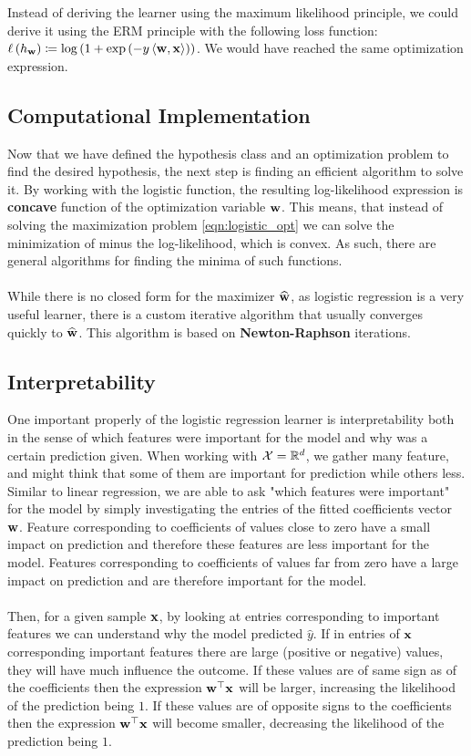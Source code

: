 \begin{remark}
	Instead of deriving the learner using the maximum likelihood principle, we could derive it using the ERM principle with the following loss function: $\ell\left(h_{\mathbf{w}}\right)\coloneqq \log\left(1+\exp\left(-y\left\langle \mathbf{w},\mathbf{x}\right\rangle\right)\right)$. We would have reached the same optimization expression.
\end{remark}

\subsection{Computational Implementation}
Now that we have defined the hypothesis class and an optimization problem to find the desired hypothesis, the next step is finding an efficient algorithm to solve it. By working with the logistic function, the resulting log-likelihood expression is \textbf{concave} function of the optimization variable $\mathbf{w}$. This means, that instead of solving the maximization problem \ref{eqn:logistic_opt} we can solve the minimization of minus the log-likelihood, which is convex. As such, there are general algorithms for finding the minima of such functions.
\\~\\
While there is no closed form for the maximizer $\widehat{\mathbf{w}}$, as logistic regression is a very useful learner, there is a custom iterative algorithm that usually converges quickly to $\widehat{\mathbf{w}}$. This algorithm is based on \textbf{Newton-Raphson} iterations.


\subsection{Interpretability}
One important properly of the logistic regression learner is interpretability both in the sense of which features were important for the model and why was a certain prediction given. When working with $\mathcal{X}=\mathbb{R}^d$, we gather many feature, and might think that some of them are important for prediction while others less. Similar to linear regression, we are able to ask "which features were important" for the model by simply investigating the entries of the fitted coefficients vector $\mathbf{w}$. Feature corresponding to coefficients of values close to zero have a small impact on prediction and therefore these features are less important for the model. Features corresponding to coefficients of values far from zero have a large impact on prediction and are therefore important for the model.
\\~\\
Then, for a given sample $\mathbf{x}$, by looking at entries corresponding to important features we can understand why the model predicted $\widehat{y}$. If in entries of $\mathbf{x}$ corresponding important features there are large (positive or negative) values, they will have much influence the outcome. If these values are of same sign as of the coefficients then the expression $\mathbf{w}^\top\mathbf{x}$ will be larger, increasing the likelihood of the prediction being $1$. If these values are of opposite signs to the coefficients then the expression $\mathbf{w}^\top\mathbf{x}$ will become smaller, decreasing the likelihood of the prediction being $1$.



